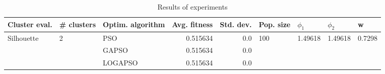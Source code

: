 \begin{table}
\centering
\caption{Results of experiments}
\begin{tabular}{lllrrllll}
\toprule
              Cluster eval. &        \# clusters & Optim. algorithm &  Avg. fitness &  Std. dev. &            Pop. size &               $\phi_{1}$ &               $\phi_{2}$ &                       w \\
\midrule
\multirow{3}{*}{Silhouette} & \multirow{3}{*}{2} &              PSO &      0.515634 &        0.0 & \multirow{3}{*}{100} & \multirow{3}{*}{1.49618} & \multirow{3}{*}{1.49618} & \multirow{3}{*}{0.7298} \\
                            &                    &            GAPSO &      0.515634 &        0.0 &                      &                          &                          &                         \\
                            &                    &          LOGAPSO &      0.515634 &        0.0 &                      &                          &                          &                         \\
\bottomrule
\end{tabular}
\end{table}
